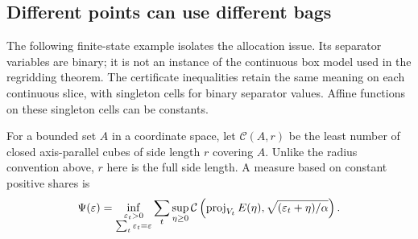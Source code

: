 \subsection{Different points can use different bags}
\label{sec:allocation-staircase}
The following finite-state example isolates the allocation issue. Its
separator variables are binary; it is not an instance of the continuous
box model used in the regridding theorem. The certificate inequalities
retain the same meaning on each continuous slice, with singleton cells
for binary separator values. Affine functions on these singleton cells
can be constants.

For a bounded set $A$ in a coordinate space, let $\mathcal C(A,r)$ be
the least number of closed axis-parallel cubes of side length $r$ covering
$A$. Unlike the radius convention above, $r$ here is the full side
length. A measure based on constant positive shares is
\begin{equation}\label{eq:allocation-constant-shares}
 \Psi(\varepsilon)=\inf_{\substack{\varepsilon_t>0\\\sum_t\varepsilon_t=\varepsilon}}
 \sum_t\sup_{\eta\ge0}\mathcal C\left(
 \operatorname{proj}_{V_t}E(\eta),
 \sqrt{(\varepsilon_t+\eta)/\alpha}\right).
\end{equation}

